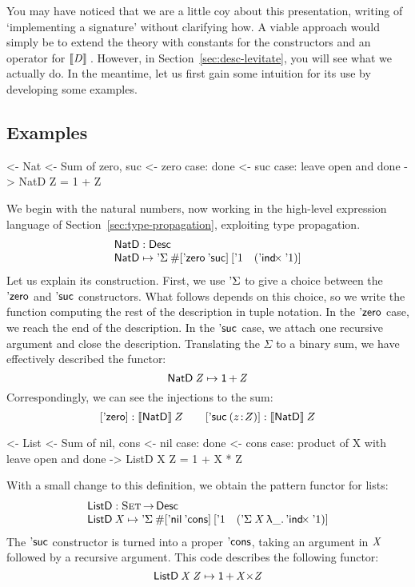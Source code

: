 You may have noticed that we are a little coy about this presentation,
writing of `implementing a signature' without clarifying how. A viable
approach would simply be to extend the theory with constants for the
constructors and an operator for \(\descop{\V{D}}\). However, in
Section~\ref{sec:desc-levitate}, you will see what we actually do.  In
the meantime, let us first gain some intuition for its use by
developing some examples.

\subsection{Examples}
\label{sec:desc-examples}

\begin{wstructure}
<- Nat
    <- Sum of zero, suc
    <- zero case: done
    <- suc case: leave open and done
    -> NatD Z = 1 + Z
\end{wstructure}

We begin with the natural numbers, now working in the high-level
expression language of Section~\ref{sec:type-propagation}, exploiting
type propagation.
%
\[\stk{
\NatD : \Desc \\
\NatD \mapsto \DSigma{\EnumT{\sqr{\NatZero\: \SYMBNatSuc }}}
                     {\sqr{ \DUnit \quad (\DIndx{\DUnit}) }}
}\]
%
Let us explain its construction. First, we use $\SYMBDSigma$ to
give a choice between the $\NatZero$ and $\SYMBNatSuc$ constructors.
What follows depends on this choice, so we write the function
computing the rest of the description in tuple notation.  In the
$\NatZero$ case, we reach the end of the description. In the
$\SYMBNatSuc$ case, we attach one recursive argument and close the
description. Translating the \(\Sigma\) to a binary sum, we have
effectively described the functor:
%
\[    \NatD\: \V{Z} \mapsto \Unit \mathop{\D{+}} \V{Z}    \]
Correspondingly, we can see the injections to the sum:
\[
\sqr{\NatZero}:\descop{\NatD}Z \qquad
\sqr{\NatSuc{(\Bhab{z}{Z})}}:\descop{\NatD}Z
\]

\begin{wstructure}
<- List
    <- Sum of nil, cons
    <- nil case: done
    <- cons case: product of X with leave open and done
    -> ListD X Z = 1 + X * Z
\end{wstructure}

With a small change to this definition, we obtain the pattern functor
for lists:
%
\[\stk{
\ListD : \Set \To \Desc \\
\ListD \: \V{X} \mapsto
 \DSigma{\EnumT{\sqr{ \ListNil\: \SYMBListCons }}}
         {\sqr{ \DUnit \quad (\DSigma{\V{X}}{\LAM{\_} \DIndx{\DUnit}}) }}
}\]
%
The $\SYMBNatSuc$ constructor is turned into a proper
$\SYMBListCons$, taking an argument in $\V{X}$ followed by a
recursive argument. This code describes the following functor:
%
\[    \ListD\: \V{X}\: \V{Z} \mapsto \Unit \mathop{\D{+}} \V{X} \D{\ensuremath{\times}} \V{Z}     \]

